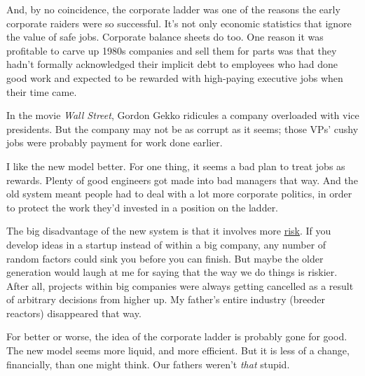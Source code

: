 And, by no coincidence, the corporate ladder
                  was one of the reasons the early corporate raiders were so
                  successful. It's not only economic statistics that ignore the
                  value of safe jobs. Corporate balance sheets do too. One
                  reason it was profitable to carve up 1980s companies and sell
                  them for parts was that they hadn't formally acknowledged
                  their implicit debt to employees who had done good work and
                  expected to be rewarded with high-paying executive jobs when
                  their time came.

In the movie \emph{Wall Street},
                  Gordon Gekko ridicules a company overloaded with vice
                  presidents. But the company may not be as corrupt as it seems;
                  those VPs' cushy jobs were probably payment for work done
                  earlier.

I like the new model better. For one
                  thing, it seems a bad plan to treat jobs as rewards. Plenty of
                  good engineers got made into bad managers that way. And the
                  old system meant people had to deal with a lot more corporate
                  politics, in order to protect the work they'd invested in a
                  position on the ladder.

The big disadvantage of the
                  new system is that it involves more
                  \href{http://www.paulgraham.com/inequality.html}{risk}. If you develop ideas in a
                  startup instead of within a big company, any number of random
                  factors could sink you before you can finish. But maybe the
                  older generation would laugh at me for saying that the way we
                  do things is riskier. After all, projects within big companies
                  were always getting cancelled as a result of arbitrary
                  decisions from higher up. My father's entire industry (breeder
                  reactors) disappeared that way.

For better or
                  worse, the idea of the corporate ladder is probably gone for
                  good. The new model seems more liquid, and more efficient. But
                  it is less of a change, financially, than one might think. Our
                  fathers weren't
                  \emph{that} stupid.





              
            
          

